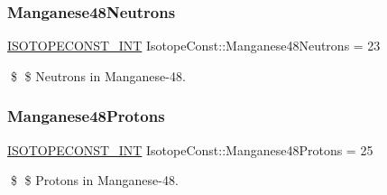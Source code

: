 \subsubsection{\texorpdfstring{Manganese48\+Neutrons}{Manganese48Neutrons}}
{\footnotesize\ttfamily \mbox{\hyperlink{group___isotope_const-_macros_ga5f18360b3e99483a35c32d789e62621c}{I\+S\+O\+T\+O\+P\+E\+C\+O\+N\+S\+T\+\_\+\+I\+NT}} Isotope\+Const\+::\+Manganese48\+Neutrons = 23}

\$ \$ Neutrons in Manganese-\/48. \mbox{\label{group___isotope_const-_manganese-_mn48_ga281bf9cb6445197a274bcad354de2059}} 
\subsubsection{\texorpdfstring{Manganese48\+Protons}{Manganese48Protons}}
{\footnotesize\ttfamily \mbox{\hyperlink{group___isotope_const-_macros_ga5f18360b3e99483a35c32d789e62621c}{I\+S\+O\+T\+O\+P\+E\+C\+O\+N\+S\+T\+\_\+\+I\+NT}} Isotope\+Const\+::\+Manganese48\+Protons = 25}

\$ \$ Protons in Manganese-\/48. 